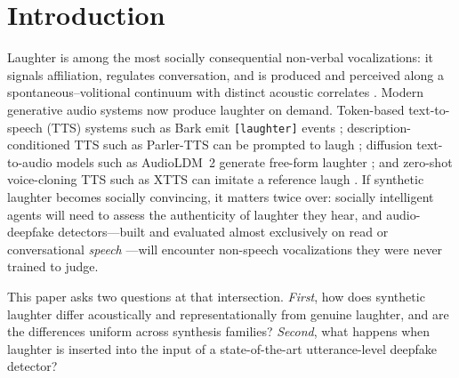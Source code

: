\documentclass[sigconf,anonymous,review]{acmart}
\begin{document}

\maketitle

\section{Introduction}
Laughter is among the most socially consequential non-verbal vocalizations: it signals affiliation, regulates conversation, and is produced and perceived along a spontaneous--volitional continuum with distinct acoustic correlates \cite{scott2014social,bachorowski2001acoustic,bryant2014animal,lavan2016laugh}. Modern generative audio systems now produce laughter on demand. Token-based text-to-speech (TTS) systems such as Bark emit \texttt{[laughter]} events \cite{bark2023}; description-conditioned TTS such as Parler-TTS can be prompted to laugh \cite{lyth2024parler}; diffusion text-to-audio models such as AudioLDM~2 generate free-form laughter \cite{liu2024audioldm2}; and zero-shot voice-cloning TTS such as XTTS can imitate a reference laugh \cite{casanova2024xtts}. If synthetic laughter becomes socially convincing, it matters twice over: socially intelligent agents will need to assess the authenticity of laughter they hear, and audio-deepfake detectors---built and evaluated almost exclusively on read or conversational \emph{speech} \cite{wang2020asvspoof,muller2022does}---will encounter non-speech vocalizations they were never trained to judge.

This paper asks two questions at that intersection. \emph{First}, how does synthetic laughter differ acoustically and representationally from genuine laughter, and are the differences uniform across synthesis families? \emph{Second}, what happens when laughter is inserted into the input of a state-of-the-art utterance-level deepfake detector?
\end{document}
